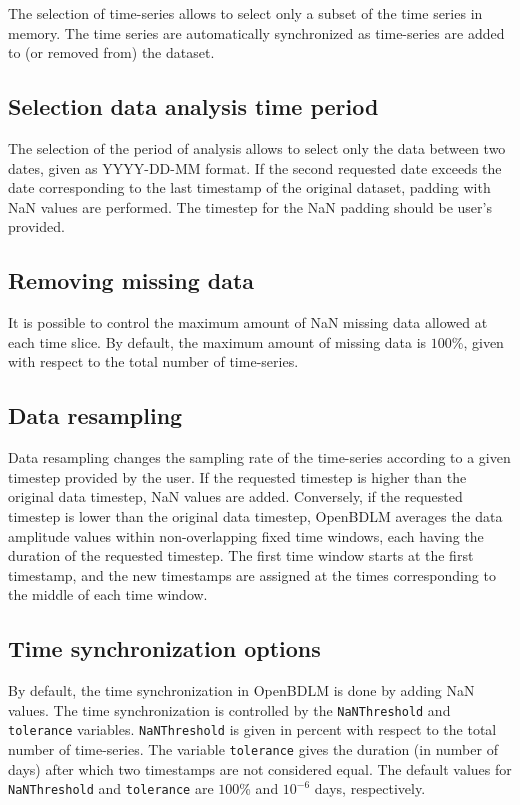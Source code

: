 \documentclass{article}
\begin{document}
The selection of time-series allows to select only a subset of the time series in memory.
The time series are automatically synchronized as time-series are added to (or removed from) the dataset.

\subsection{Selection data analysis time period}
\label{SS:SelectionPeriodAnalysis}

The selection of the period of analysis allows to select only the data between two dates, given as \textquotesingle YYYY-DD-MM\textquotesingle {} format.
If the second requested date exceeds the date corresponding to the last timestamp of the original dataset, padding with NaN values are performed. 
The timestep for the NaN padding should be user's provided.

\subsection{Removing missing data}
\label{SS:MissingDataRemoval}

It is possible to control the maximum amount of NaN missing data allowed at each time slice. 
By default, the maximum amount of missing data is $100$\%, given with respect to the total number of time-series.

\subsection{Data resampling}
\label{SS:DataResampling}
Data resampling changes the sampling rate of the time-series according to a given timestep provided by the user. 
If the requested timestep is higher than the original data timestep, NaN values are added.
Conversely, if the requested timestep is lower than the original  data timestep, OpenBDLM averages the data amplitude values within non-overlapping fixed time windows, each having the duration of the requested timestep.
The first time window starts at the first timestamp, and the new timestamps are assigned at the times corresponding to the middle of each time window.

\subsection{Time synchronization options}
\label{SS:synchronization}
By default, the time synchronization in OpenBDLM is done by adding NaN values.
The time synchronization is controlled by the \lstinline!NaNThreshold! and \lstinline!tolerance! variables.
\lstinline!NaNThreshold!  is given in percent with respect to the total number of time-series.
The variable \lstinline!tolerance! gives the duration (in number of days) after which two timestamps are not considered equal.
The default values for \lstinline!NaNThreshold!  and \lstinline!tolerance! are  $100$\% and $10^{-6}$ days, respectively. 
\end{document}
